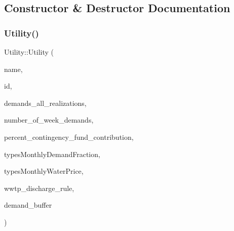 \subsection{Constructor \& Destructor Documentation}
\mbox{\label{classUtility_adb0e1f43122886122d2437efbc5cd756}} 
\subsubsection{\texorpdfstring{Utility()}{Utility()}\hspace{0.1cm}{\footnotesize\ttfamily [1/4]}}
{\footnotesize\ttfamily Utility\+::\+Utility (\begin{DoxyParamCaption}\item[{const char $\ast$}]{name,  }\item[{int}]{id,  }\item[{vector$<$ vector$<$ double $>$$>$ \&}]{demands\+\_\+all\+\_\+realizations,  }\item[{int}]{number\+\_\+of\+\_\+week\+\_\+demands,  }\item[{const double}]{percent\+\_\+contingency\+\_\+fund\+\_\+contribution,  }\item[{const vector$<$ vector$<$ double $>$$>$ \&}]{types\+Monthly\+Demand\+Fraction,  }\item[{const vector$<$ vector$<$ double $>$$>$ \&}]{types\+Monthly\+Water\+Price,  }\item[{\mbox{\hyperlink{classWwtpDischargeRule}{Wwtp\+Discharge\+Rule}}}]{wwtp\+\_\+discharge\+\_\+rule,  }\item[{double}]{demand\+\_\+buffer }\end{DoxyParamCaption})}

